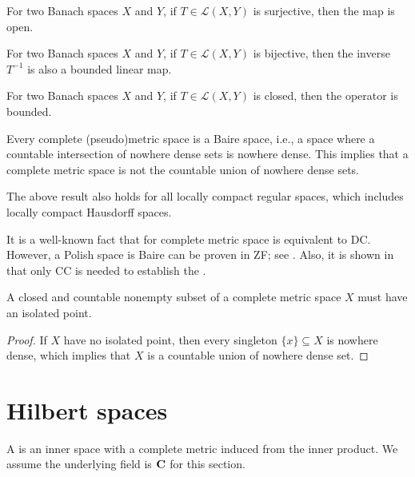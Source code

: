 \begin{namedthm} \label{thm:OMT}
    For two Banach spaces $X$ and $Y$, if $T\in \mathcal L(X,Y)$ is surjective, then the map is open.
\end{namedthm}

\begin{cor}
    For two Banach spaces $X$ and $Y$, if $T\in \mathcal L(X,Y)$ is bijective, then the inverse $T^{-1}$ is also a bounded linear map.
\end{cor}

\begin{namedthm} \label{thm:CGT}
    For two Banach spaces $X$ and $Y$, if $T\in \mathcal L(X,Y)$ is closed, then the operator is bounded.
\end{namedthm}

\begin{namedthm} \label{thm:Baire}
    Every complete (pseudo)metric space is a Baire space, i.e., a space where a countable intersection of nowhere dense sets is nowhere dense. This implies that a complete metric space is not the countable union of nowhere dense sets.

    The above result also holds for all locally compact regular spaces, which includes locally compact Hausdorff spaces.
\end{namedthm}

It is a well-known fact that  for complete metric space is equivalent to \textsf{DC}.
However, a Polish space is Baire can be proven in \textsf{ZF}; see \cite[Theorem~4.102]{Herrlich_2006}.
Also, it is shown in \cite{Fellhauer_2017} that only \textsf{CC} is needed to establish the .

\begin{prop}
    A closed and countable nonempty subset of a complete metric space $X$ must have an isolated point.
\end{prop}
\begin{proof} 
    If $X$ have no isolated point, then every singleton $\{x\} \subseteq X$ is nowhere dense, which implies that $X$ is a countable union of nowhere dense set.
\end{proof}

\section{Hilbert spaces}
A  is an inner space with a complete metric induced from the inner product. We assume the underlying field is $\mathbf{C}$ for this section.

